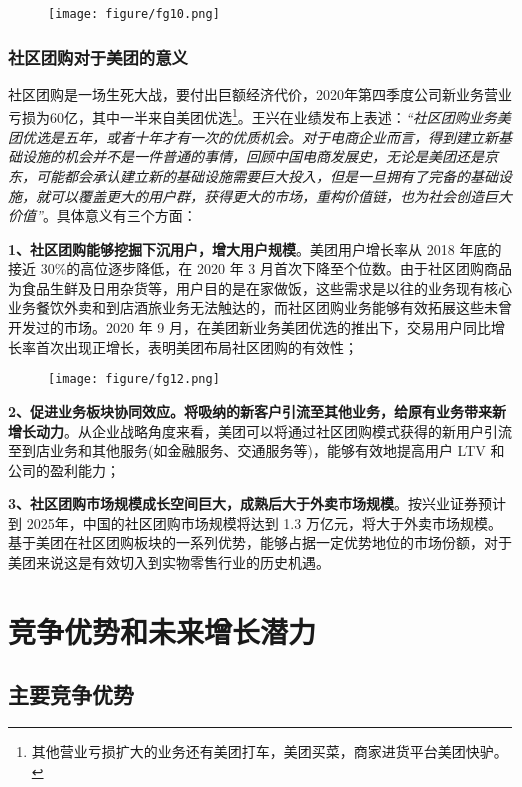 \documentclass[UTF8,a4paper,12pt,lang=cn,fontset = windows]{elegantpaper} %
\begin{document}
\begin{figure}[htbp]
  \centering
  \texttt{[image: figure/fg10.png]}
  \end{figure}

\subsubsection{社区团购对于美团的意义}

社区团购是一场生死大战，要付出巨额经济代价，2020年第四季度公司新业务营业亏损为60亿，其中一半来自美团优选\footnote{其他营业亏损扩大的业务还有美团打车，美团买菜，商家进货平台美团快驴。}。王兴在业绩发布上表述：\textit{“社区团购业务美团优选是五年，或者十年才有一次的优质机会。对于电商企业而言，得到建立新基础设施的机会并不是一件普通的事情，回顾中国电商发展史，无论是美团还是京东，可能都会承认建立新的基础设施需要巨大投入，但是一旦拥有了完备的基础设施，就可以覆盖更大的用户群，获得更大的市场，重构价值链，也为社会创造巨大价值”}。具体意义有三个方面：

\textbf{1、社区团购能够挖掘下沉用户，增大用户规模}。美团用户增长率从 2018 年底的接近 30\%的高位逐步降低，在 2020 年 3 月首次下降至个位数。由于社区团购商品为食品生鲜及日用杂货等，用户目的是在家做饭，这些需求是以往的业务现有核心业务餐饮外卖和到店酒旅业务无法触达的，而社区团购业务能够有效拓展这些未曾开发过的市场。2020 年 9 月，在美团新业务美团优选的推出下，交易用户同比增长率首次出现正增长，表明美团布局社区团购的有效性；
\begin{figure}[htbp]
  \centering
  \texttt{[image: figure/fg12.png]}
  \end{figure}

\textbf{2、促进业务板块协同效应。将吸纳的新客户引流至其他业务，给原有业务带来新增长动力}。从企业战略角度来看，美团可以将通过社区团购模式获得的新用户引流至到店业务和其他服务(如金融服务、交通服务等)，能够有效地提高用户 LTV 和公司的盈利能力；

\textbf{3、社区团购市场规模成长空间巨大，成熟后大于外卖市场规模}。按兴业证券预计到 2025年，中国的社区团购市场规模将达到 1.3 万亿元，将大于外卖市场规模。基于美团在社区团购板块的一系列优势，能够占据一定优势地位的市场份额，对于美团来说这是有效切入到实物零售行业的历史机遇。


\section{竞争优势和未来增长潜力}
\subsection{主要竞争优势}
\end{document}
